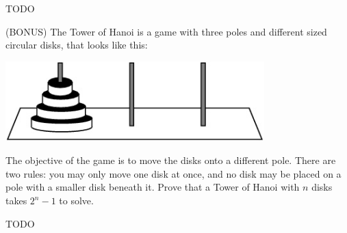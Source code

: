 \documentclass[solution, letterpaper]{cs20inclass}
\begin{document}
\begin{solution}

TODO

\end{solution}

\problem (BONUS) The Tower of Hanoi is a game with three poles and different sized circular disks, that looks like this:
\begin{center}
\includegraphics[width=10cm]{hanoi.jpg}
\end{center}
The objective of the game is to move the disks onto a different pole. There are two rules: you may only move one disk at once, and no disk may be placed on a pole with a smaller disk beneath it. Prove that a Tower of Hanoi with $n$ disks takes $2^n-1$ to solve.
\begin{solution}

TODO
 
\end{solution}
\end{document}
